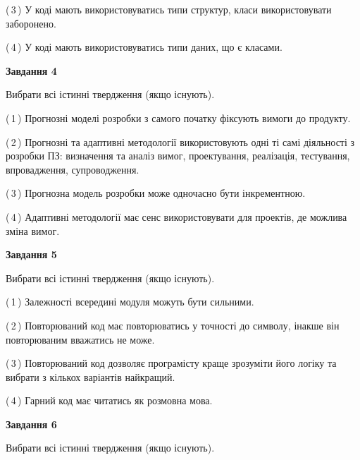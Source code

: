 \documentclass[10pt, ukrainian]{article}
\begin{document}
{\begin {large}
(\,3\,) У коді мають використовуватись типи структур, класи використовувати заборонено. %



(\,4\,) У коді мають використовуватись типи даних, що є класами. %


{\begin {center}\textbf{Завдання 4}\end {center}}\par
Вибрати всі істинні твердження (якщо існують).\par
\vspace{2mm}



(\,1\,) Прогнозні моделі розробки з самого початку фіксують вимоги до продукту. %



(\,2\,) Прогнозні та адаптивні методології використовують одні ті самі діяльності з розробки ПЗ: визначення та аналіз вимог, проектування, реалізація, тестування, впровадження, супроводження. %



(\,3\,) Прогнозна модель розробки може одночасно бути інкрементною. %



(\,4\,) Адаптивні методології має сенс використовувати для проектів, де можлива зміна вимог. %


{\begin {center}\textbf{Завдання 5}\end {center}}\par
Вибрати всі істинні твердження (якщо існують).\par
\vspace{2mm}



(\,1\,) Залежності всередині модуля можуть бути сильними. %



(\,2\,) Повторюваний код має повторюватись у точності до символу, інакше він повторюваним вважатись не може. %



(\,3\,) Повторюваний код дозволяє програмісту краще зрозуміти його логіку та вибрати з кількох варіантів найкращий. %



(\,4\,) Гарний код має читатись як розмовна мова. %

\newpage

{\begin {center}\textbf{Завдання 6}\end {center}}\par
Вибрати всі істинні твердження (якщо існують).\par
\vspace{2mm}




\end{large}}
\end{document}
